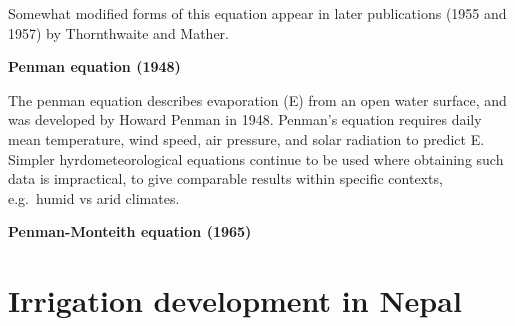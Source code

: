 \documentclass[
  openany]{book}
\begin{document}
Somewhat modified forms of this equation appear in later publications (1955 and 1957) by Thornthwaite and Mather.

\textbf{Penman equation (1948)}

The penman equation describes evaporation (E) from an open water surface, and was developed by Howard Penman in 1948. Penman's equation requires daily mean temperature, wind speed, air pressure, and solar radiation to predict E. Simpler hyrdometeorological equations continue to be used where obtaining such data is impractical, to give comparable results within specific contexts, e.g.~humid vs arid climates.

\textbf{Penman-Monteith equation (1965)}

\hypertarget{irrigation-development-in-nepal}{%
\section{Irrigation development in Nepal}\label{irrigation-development-in-nepal}}
\end{document}
